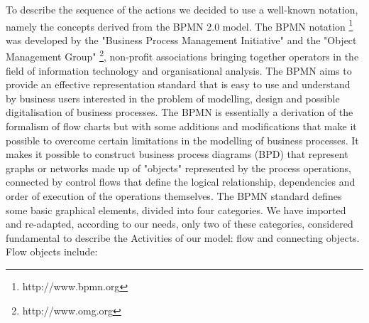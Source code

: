 To describe the sequence of the actions we decided to use a well-known notation, namely the concepts derived from the BPMN 2.0 model.
The BPMN notation \footnote{http://www.bpmn.org} was developed by the "Business Process Management Initiative" and the "Object Management Group" \footnote{http://www.omg.org}, non-profit associations bringing together operators in the field of information technology and organisational analysis. The BPMN aims to provide an effective representation standard that is easy to use and understand by business users interested in the problem of modelling, design and possible digitalisation of business processes.
The BPMN is essentially a derivation of the formalism of flow charts but with some additions and modifications that make it possible to overcome certain limitations in the modelling of business processes. It makes it possible to construct business process diagrams (BPD) that represent graphs or networks made up of "objects" represented by the process operations, connected by control flows that define the logical relationship, dependencies and order of execution of the operations themselves. 
The BPMN standard defines some basic graphical elements, divided into four categories. We have imported and re-adapted, according to our needs, only two of these categories, considered fundamental to describe the Activities of our model: flow and connecting objects. Flow objects include:

